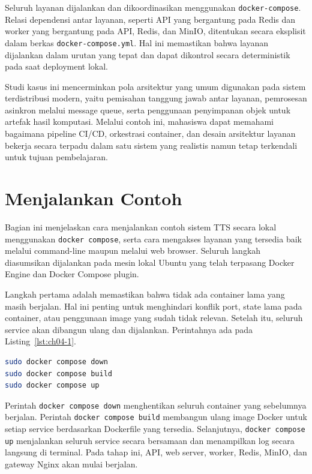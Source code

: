 Seluruh layanan dijalankan dan dikoordinasikan menggunakan
\texttt{docker-compose}. Relasi dependensi antar layanan, seperti API yang
bergantung pada Redis dan worker yang bergantung pada API, Redis, dan MinIO,
ditentukan secara eksplisit dalam berkas \texttt{docker-compose.yml}. Hal ini
memastikan bahwa layanan dijalankan dalam urutan yang tepat dan dapat
dikontrol secara deterministik pada saat deployment lokal.

Studi kasus ini mencerminkan pola arsitektur yang umum digunakan pada sistem
terdistribusi modern, yaitu pemisahan tanggung jawab antar layanan,
pemrosesan asinkron melalui message queue, serta penggunaan penyimpanan objek
untuk artefak hasil komputasi. Melalui contoh ini, mahasiswa dapat memahami
bagaimana pipeline CI/CD, orkestrasi container, dan desain arsitektur layanan
bekerja secara terpadu dalam satu sistem yang realistis namun tetap
terkendali untuk tujuan pembelajaran.


\section{Menjalankan Contoh}

Bagian ini menjelaskan cara menjalankan contoh sistem TTS secara lokal
menggunakan \texttt{docker compose}, serta cara mengakses layanan yang
tersedia baik melalui command-line maupun melalui web browser. Seluruh
langkah diasumsikan dijalankan pada mesin lokal Ubuntu yang telah terpasang
Docker Engine dan Docker Compose plugin.

Langkah pertama adalah memastikan bahwa tidak ada container lama yang masih
berjalan. Hal ini penting untuk menghindari konflik port, state lama pada
container, atau penggunaan image yang sudah tidak relevan. Setelah itu,
seluruh service akan dibangun ulang dan dijalankan. Perintahnya ada pada Listing~\ref{lst:ch04-1}.

\begin{lstlisting}[language=bash, caption={Perintah sudo docker compose down}, label={lst:ch04-1}]
sudo docker compose down
sudo docker compose build
sudo docker compose up
\end{lstlisting}

Perintah \texttt{docker compose down} menghentikan seluruh container yang
sebelumnya berjalan. Perintah \texttt{docker compose build} membangun ulang
image Docker untuk setiap service berdasarkan Dockerfile yang tersedia.
Selanjutnya, \texttt{docker compose up} menjalankan seluruh service secara
bersamaan dan menampilkan log secara langsung di terminal. Pada tahap ini,
API, web server, worker, Redis, MinIO, dan gateway Nginx akan mulai berjalan.

